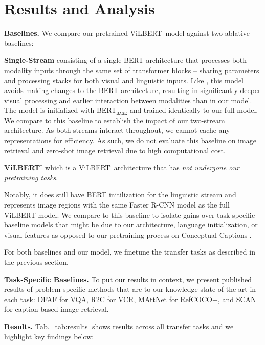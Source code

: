 \section{Results and Analysis}
\label{sec:res}

\textbf{Baselines.} We compare our pretrained ViLBERT~model against two ablative baselines:

\begin{compactitem}[--]
\item \textbf{Single-Stream} consisting of a single BERT architecture that processes both modality inputs through the same set of transformer blocks -- sharing parameters and processing stacks for both visual and linguistic inputs. Like \cite{sun2019videobert}, this model avoids making changes to the BERT architecture, resulting in significantly deeper visual processing and earlier interaction between modalities than in our model. The model is initialized with BERT$_{\texttt{BASE}}$ and trained identically to our full model. We compare to this baseline to establish the impact of our two-stream architecture. As both streams interact throughout, we cannot cache any representations for efficiency. As such, we do not evaluate this baseline on image retrieval and zero-shot image retrieval due to high computational cost.
\item \textbf{ViLBERT$^\dagger$} which is a ViLBERT~architecture that has \textit{not undergone our pretraining tasks}. 

Notably, it does still have BERT initilization for the linguistic stream and represents image regions with the same Faster R-CNN model as the full ViLBERT model. We compare to this baseline to isolate gains over task-specific baseline models that might be due to our architecture, language initialization, or visual features as opposed to our pretraining process on Conceptual Captions .
\end{compactitem}

For both baselines and our model, we finetune the transfer tasks as described in the previous section.

\textbf{Task-Specific Baselines.} To put our results in context, we present published results of problem-specific methods that are to our knowledge state-of-the-art in each task:  DFAF \cite{peng2018dynamic} for VQA, R2C \cite{zellers2018vcr} for VCR, MAttNet \cite{yu2018mattnet} for RefCOCO+, and SCAN \cite{lee2018stacked} for caption-based image retrieval. 

\textbf{Results.} Tab.~\ref{tab:results} shows results across all transfer tasks and we highlight key findings below:

